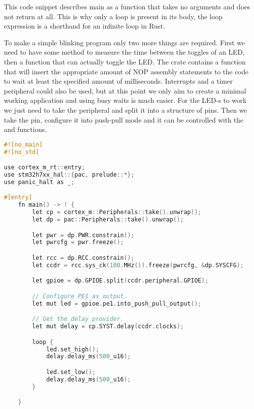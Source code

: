 This code snippet describes main as a function that takes no arguments and does not return at all. This is why only a loop is present in its body, the loop expression is a shorthand for an infinite loop in Rust.

To make a simple blinking program only two more things are required. First we need to have some method to measure the time between the toggles of an LED, then a function that can actually toggle the LED. The  crate contains a  function that will insert the appropriate amount of NOP assembly statements to the code to wait at least the specified amount of milliseconds. Interrupts and a timer peripheral could also be used, but at this point we only aim to create a minimal working application and using busy waits is much easier. For the LED-s to work we just need to take the  peripheral and split it into a structure of pins. Then we take the  pin, configure it into push-pull mode and it can be controlled with the  and  functions.

\begin{lstlisting}[language=C,frame=single,float=!ht,label={lst:embedded-hello-world},caption={Embedded Hello World (Blink) in Rust}]
#![no_main]
#![no_std]

use cortex_m_rt::entry;
use stm32h7xx_hal::{pac, prelude::*};
use panic_halt as _;

#[entry]
    fn main() -> ! {
        let cp = cortex_m::Peripherals::take().unwrap();
        let dp = pac::Peripherals::take().unwrap();

        let pwr = dp.PWR.constrain();
        let pwrcfg = pwr.freeze();

        let rcc = dp.RCC.constrain();
        let ccdr = rcc.sys_ck(100.MHz()).freeze(pwrcfg, &dp.SYSCFG);

        let gpioe = dp.GPIOE.split(ccdr.peripheral.GPIOE);

        // Configure PE1 as output.
        let mut led = gpioe.pe1.into_push_pull_output();

        // Get the delay provider.
        let mut delay = cp.SYST.delay(ccdr.clocks);

        loop {
            led.set_high();
            delay.delay_ms(500_u16);

            led.set_low();
            delay.delay_ms(500_u16);
        }

    }
\end{lstlisting}

